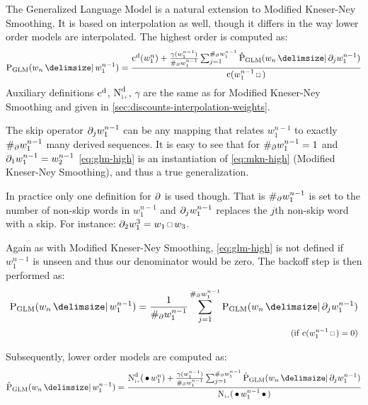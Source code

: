 The Generalized Language Model is a natural extension to Modified Kneser-Ney
Smoothing.
It is based on interpolation as well, though it differs in the way lower order
models are interpolated.
The highest order is computed as:
\begin{equation}
  \label{eq:glm-high}
  \ProbGLM{w_n}{w_1^{n-1}} =
    \frac{\DiscountedCount(w_1^n) + \frac{\gamma(w_1^{n-1})}{\NumSkpOp{w_1^{n-1}}}
                                    \sum_{j=1}^{\NumSkpOp{w_1^{n-1}}} \ProbGLM*{w_n}{\SkpOp[j]{w_1^{n-1}}}}
         {\Count(w_1^{n-1} \Skp)}
\end{equation}
Auxiliary definitions $\DiscountedCount$, $\DiscountedCount*$, $\gamma$ are the
same as for Modified Kneser-Ney Smoothing and given in
\cref{sec:discounts-interpolation-weights}.

The skip operator $\SkpOp[j]{w_1^{n-1}}$ can be any mapping that relates
$w_1^{n-1}$ to exactly $\NumSkpOp{w_1^{n-1}}$ many derived sequences.
It is easy to see that for $\NumSkpOp{w_1^{n-1}} = 1$ and
$\SkpOp[1]{w_1^{n-1}} = w_2^{n-1}$ \cref{eq:glm-high} is an
instantiation of \cref{eq:mkn-high} (Modified Kneser-Ney Smoothing), and thus
a true generalization.

In practice only one definition for $\SkpOp$ is used though.
That is $\NumSkpOp{w_1^{n-1}}$ is set to the number of non-skip words in
$w_1^{n-1}$ and $\SkpOp[j]{w_1^{n-1}}$ replaces the $j$th non-skip word with
a skip.
For instance: $\SkpOp[2]{w_1^3} = w_1 \Skp w_3$.

Again as with Modified Kneser-Ney Smoothing, \cref{eq:glm-high} is not
defined if $w_1^{n-1}$ is unseen and thus our denominator would be zero.
The backoff step is then performed as:
\begin{equation}
  \label{eq:glm-backoff}
  \begin{split}
    \ProbGLM{w_n}{w_1^{n-1}} = \frac{1}{\NumSkpOp{w_1^{n-1}}}
                               \sum_{j=1}^{\NumSkpOp{w_1^{n-1}}} \ProbGLM{w_n}{\SkpOp[j]{w_1^{n-1}}} \\
      \hfill \Condition{\Count(w_1^{n-1} \Skp) = 0}
  \end{split}
\end{equation}

Subsequently, lower order models are computed as:
\begin{equation}
  \label{eq:glm-low}
  \ProbGLM*{w_n}{w_1^{n-1}} =
    \frac{\DiscountedCount*(\WSkp w_1^n) + \frac{\gamma(w_1^{n-1})}{\NumSkpOp{w_1^{n-1}}}
                                     \sum_{j=1}^{\NumSkpOp{w_1^{n-1}}} \ProbGLM*{w_n}{\SkpOp[j]{w_1^{n-1}}}}
         {\ContCountIp(\WSkp w_1^{n-1} \WSkp)}
\end{equation}

